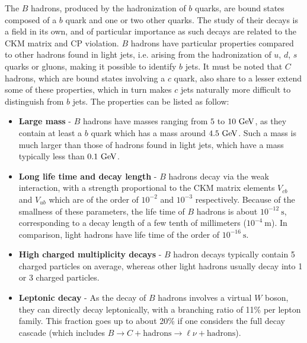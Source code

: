     The $B$ hadrons, produced by the hadronization of $b$ quarks, are bound
    states composed of a $b$ quark and one or two other quarks. The study of
    their decays is a field in its own, and of particular importance as such
    decays are related to the CKM matrix and CP violation. $B$ hadrons have
    particular properties compared to other hadrons found in light jets, i.e.
    arising from the hadronization of $u$, $d$, $s$ quarks or gluons, making it
    possible to identify $b$ jets. It must be noted that $C$ hadrons, which are
    bound states involving a $c$ quark, also share to a lesser extend some of
    these properties, which in turn makes $c$ jets naturally more difficult to
    distinguish from $b$ jets. The properties can be listed as follow:
    \begin{itemize}
        \item \textbf{Large mass} - $B$ hadrons have masses ranging from $5$ to
            $10~\text{GeV}$, as they contain at least a $b$ quark which has a mass
            around $4.5~\text{GeV}$. Such a mass is much larger than those of hadrons
            found in light jets, which have a mass typically less than
            $0.1~\text{GeV}$.
        \item \textbf{Long life time and decay length} - $B$ hadrons decay via
            the weak interaction, with a strength proportional to the CKM matrix
            elements $V_{cb}$ and $V_{ub}$ which are of the order of $10^{-2}$
            and $10^{-3}$ respectively. Because of the smallness of these
            parameters, the life time of $B$ hadrons is about
            $10^{-12}~\text{s}$, corresponding to a decay length of a few tenth
            of millimeters ($10^{-4}~\text{m}$). In comparison, light hadrons
            have life time of the order of $10^{-16}~\text{s}$.
        \item \textbf{High charged multiplicity decays} - $B$ hadron decays
            typically contain 5 charged particles on average, whereas other
            light hadrons usually decay into 1 or 3 charged particles.
        \item \textbf{Leptonic decay} - As the decay of $B$ hadrons involves a
            virtual $W$ boson, they can directly decay leptonically, with a
            branching ratio of 11\% per lepton family. This fraction goes up to
            about 20\% if one considers the full decay cascade (which includes
            $B \rightarrow C + \text{hadrons} \rightarrow \ell\nu +
            \text{hadrons}$).
    \end{itemize}

